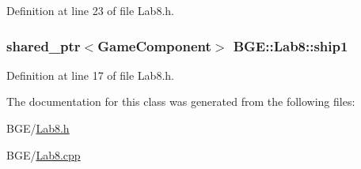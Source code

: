 Definition at line 23 of file Lab8.\-h.

\hypertarget{class_b_g_e_1_1_lab8_a83a902c44c2446db8f2876b5b6b518e0}{
\subsubsection[{ship1}]{\setlength{\rightskip}{0pt plus 5cm}shared\-\_\-ptr$<${\bf Game\-Component}$>$ B\-G\-E\-::\-Lab8\-::ship1}}\label{class_b_g_e_1_1_lab8_a83a902c44c2446db8f2876b5b6b518e0}


Definition at line 17 of file Lab8.\-h.



The documentation for this class was generated from the following files\-:\begin{DoxyCompactItemize}
\item 
B\-G\-E/\hyperlink{_lab8_8h}{Lab8.\-h}\item 
B\-G\-E/\hyperlink{_lab8_8cpp}{Lab8.\-cpp}\end{DoxyCompactItemize}
